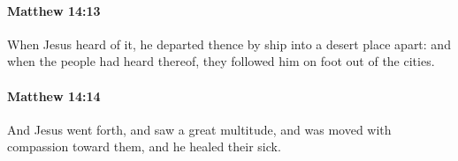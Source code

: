 		\paragraph{Matthew 14:13} %
			\label{MATTHEW-14-13}

			When Jesus heard of it, he departed thence by ship into a desert place apart: and when the people had heard thereof, they followed him on foot out of the cities.

			\begin{framed}
			\scriptsize
				\begin{compactdesc}
					\item[SBLG] 
				\end{compactdesc}
			\end{framed}

		\paragraph{Matthew 14:14} %
			\label{MATTHEW-14-14}

			And Jesus went forth, and saw a great multitude, and was moved with compassion toward them, and he healed their sick.

